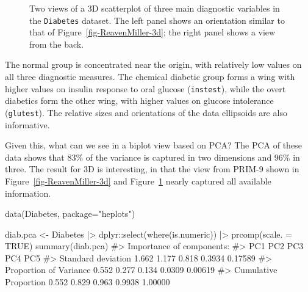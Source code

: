 \documentclass[
  letterpaper,
  10pt,
  krantz2]{krantz}
\makeatletter
\newenvironment{Shaded}{\begin{snugshade}}{\end{snugshade}}
\newcommand{\AttributeTok}[1]{\textcolor[rgb]{0.40,0.45,0.13}{#1}}
\newcommand{\CommentTok}[1]{\textcolor[rgb]{0.37,0.37,0.37}{#1}}
\newcommand{\ConstantTok}[1]{\textcolor[rgb]{0.56,0.35,0.01}{#1}}
\newcommand{\FunctionTok}[1]{\textcolor[rgb]{0.28,0.35,0.67}{#1}}
\newcommand{\NormalTok}[1]{\textcolor[rgb]{0.00,0.23,0.31}{#1}}
\newcommand{\OtherTok}[1]{\textcolor[rgb]{0.00,0.23,0.31}{#1}}
\newcommand{\SpecialCharTok}[1]{\textcolor[rgb]{0.37,0.37,0.37}{#1}}
\newcommand{\StringTok}[1]{\textcolor[rgb]{0.13,0.47,0.30}{#1}}
\newenvironment{kframe}{%
  \medskip{}
  \setlength{\fboxsep}{.8em}
  \def\at@end@of@kframe{}%
  \ifinner\ifhmode%
  \def\at@end@of@kframe{\end{minipage}}%
  \begin{minipage}{\columnwidth}%
  \fi\fi%
  \def\FrameCommand##1{\hskip\@totalleftmargin \hskip-\fboxsep
  \colorbox{shadecolor}{##1}\hskip-\fboxsep
      \hskip-\linewidth \hskip-\@totalleftmargin \hskip\columnwidth}%
  \MakeFramed {\advance\hsize-\width
    \@totalleftmargin\z@ \linewidth\hsize
    \@setminipage}}%
{\par\unskip\endMakeFramed%
  \at@end@of@kframe}
\renewenvironment{Shaded}{\begin{kframe}}{\end{kframe}}
\makeatother
\begin{document}
\begin{figure}


\caption{\label{fig-diabetes-3d}Two views of a 3D scatterplot of three
main diagnostic variables in the \texttt{Diabetes} dataset. The left
panel shows an orientation similar to that of
Figure~\ref{fig-ReavenMiller-3d}; the right panel shows a view from the
back.}

\end{figure}%

The normal group is concentrated near the origin, with relatively low
values on all three diagnostic measures. The chemical diabetic group
forms a wing with higher values on insulin response to oral glucose
(\texttt{instest}), while the overt diabetics form the other wing, with
higher values on glucose intolerance (\texttt{glutest}). The relative
sizes and orientations of the data ellipsoids are also informative.

Given this, what can we see in a biplot view based on PCA? The PCA of
these data shows that 83\% of the variance is captured in two dimensions
and 96\% in three. The result for 3D is interesting, in that the view
from PRIM-9 shown in Figure~\ref{fig-ReavenMiller-3d} and
Figure~\ref{fig-diabetes-3d} nearly captured all available information.

\begin{Shaded}
\begin{Highlighting}[]
\FunctionTok{data}\NormalTok{(Diabetes, }\AttributeTok{package=}\StringTok{"heplots"}\NormalTok{)}

\NormalTok{diab.pca }\OtherTok{\textless{}{-}} 
\NormalTok{  Diabetes }\SpecialCharTok{|\textgreater{}} 
\NormalTok{  dplyr}\SpecialCharTok{::}\FunctionTok{select}\NormalTok{(}\FunctionTok{where}\NormalTok{(is.numeric)) }\SpecialCharTok{|\textgreater{}}
  \FunctionTok{prcomp}\NormalTok{(}\AttributeTok{scale. =} \ConstantTok{TRUE}\NormalTok{)}
\FunctionTok{summary}\NormalTok{(diab.pca)}
\CommentTok{\#\textgreater{} Importance of components:}
\CommentTok{\#\textgreater{}                          PC1   PC2   PC3    PC4     PC5}
\CommentTok{\#\textgreater{} Standard deviation     1.662 1.177 0.818 0.3934 0.17589}
\CommentTok{\#\textgreater{} Proportion of Variance 0.552 0.277 0.134 0.0309 0.00619}
\CommentTok{\#\textgreater{} Cumulative Proportion  0.552 0.829 0.963 0.9938 1.00000}
\end{Highlighting}
\end{Shaded}
\end{document}
